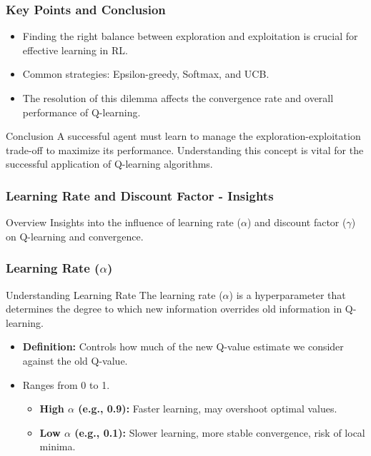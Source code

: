 \documentclass{beamer}
\begin{document}
\begin{frame}[fragile]
    \frametitle{Key Points and Conclusion}
    \begin{itemize}
        \item Finding the right balance between exploration and exploitation is crucial for effective learning in RL.
        \item Common strategies: Epsilon-greedy, Softmax, and UCB.
        \item The resolution of this dilemma affects the convergence rate and overall performance of Q-learning.
    \end{itemize}
    
    \begin{block}{Conclusion}
        A successful agent must learn to manage the exploration-exploitation trade-off to maximize its performance. Understanding this concept is vital for the successful application of Q-learning algorithms.
    \end{block}
\end{frame}

\begin{frame}[fragile]
    \frametitle{Learning Rate and Discount Factor - Insights}
    \begin{block}{Overview}
        Insights into the influence of learning rate ($\alpha$) and discount factor ($\gamma$) on Q-learning and convergence.
    \end{block}
\end{frame}

\begin{frame}[fragile]
    \frametitle{Learning Rate ($\alpha$)}
    \begin{block}{Understanding Learning Rate}
        The learning rate ($\alpha$) is a hyperparameter that determines the degree to which new information overrides old information in Q-learning.
    \end{block}
    \begin{itemize}
        \item \textbf{Definition:} Controls how much of the new Q-value estimate we consider against the old Q-value.
        \item Ranges from 0 to 1.
        \begin{itemize}
            \item \textbf{High $\alpha$ (e.g., 0.9):} Faster learning, may overshoot optimal values.
            \item \textbf{Low $\alpha$ (e.g., 0.1):} Slower learning, more stable convergence, risk of local minima.
        \end{itemize}
    \end{itemize}
\end{frame}
\end{document}
